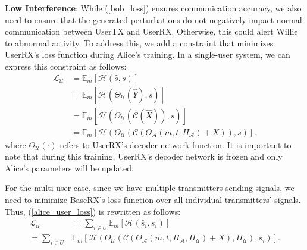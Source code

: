 
\textbf{Low Interference}: While (\ref{bob_loss}) ensures communication accuracy, we also need to ensure that the generated perturbations do not negatively impact normal communication between UserTX and UserRX. Otherwise, this could alert Willie to abnormal activity. To address this, we add a constraint that minimizes UserRX's loss function during Alice's training. In a single-user system, we can express this constraint as follows:
\begin{equation}
	\begin{aligned} \label{alice_user_loss}
		\mathcal{L}_{\mathcal{U}} & = \mathbb{E}_{m}[\mathcal{H}(\hat{s}, s)] \\
		& = \mathbb{E}_{m}[\mathcal{H}(\Theta_{\mathcal{U}}(\hat{Y}), s)] \\
		& = \mathbb{E}_{m}[\mathcal{H}(\Theta_{\mathcal{U}}(\mathcal{C}(\hat{X})), s)] \\
		& = \mathbb{E}_{m}[\mathcal{H}(\Theta_{\mathcal{U}}(\mathcal{C}(\Theta_{\mathcal{A}}(m, t, H_{\mathcal{A}}) + X)), s)].
	\end{aligned}
\end{equation}
where \(\Theta_{\mathcal{U}}(\cdot)\) refers to UserRX's decoder network function. It is important to note that during this training, UserRX's decoder network is frozen and only Alice's parameters will be updated.

For the multi-user case, since we have multiple transmitters sending signals, we need to minimize BaseRX's loss function over all individual transmitters' signals. Thus, (\ref{alice_user_loss}) is rewritten as follows:
\begin{equation}
	\begin{aligned} \label{multi_alice_user_loss}
		\mathcal{L}_{\mathcal{U}} & = \sum_{i \in U}\mathbb{E}_{m}[\mathcal{H}(\hat{s}_i, s_i)] \\
		= \sum_{i \in U} &
		\mathbb{E}_{m}[\mathcal{H}
		(\Theta_{\mathcal{U}}(\mathcal{C}(\Theta_{\mathcal{A}}(m, t, H_{\mathcal{A}}, H_{\mathcal{U}}) + X),  H_{\mathcal{U}}), s_i)].
	\end{aligned}
\end{equation}

